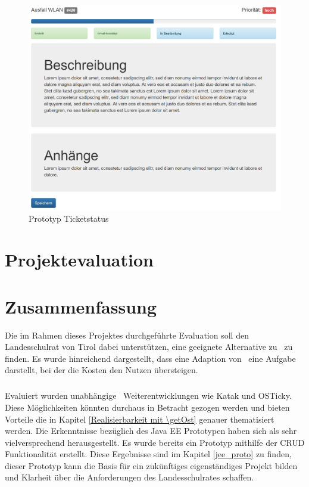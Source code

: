 \paragraph{}
\begin{figure}[h]
	\centering
	\includegraphics[scale=.5]{figures/Prototyp.png}
	\caption{Prototyp Ticketstatus}
	\label{Abb_Prototyp_Ticketstatus}
\end{figure}





\chapter{Projektevaluation}


\chapter{Zusammenfassung}
Die im Rahmen dieses Projektes durchgeführte Evaluation soll den Landesschulrat von Tirol dabei unterstützen, eine geeignete Alternative zu \getOst\ zu finden. Es wurde hinreichend dargestellt, dass eine Adaption von \getOst\ eine Aufgabe darstellt, bei der die Kosten den Nutzen übersteigen.
\paragraph{}
Evaluiert wurden unabhängige \getOst\ Weiterentwicklungen wie Katak und OSTicky. Diese Möglichkeiten könnten durchaus in Betracht gezogen werden und bieten Vorteile die in Kapitel \ref{Realisierbarkeit mit \getOst} genauer thematisiert werden. Die Erkenntnisse bezüglich des Java EE Prototypen haben sich als sehr vielversprechend herausgestellt. Es wurde bereits ein Prototyp mithilfe der CRUD Funktionalität erstellt. Diese Ergebnisse sind im Kapitel \ref{jee_proto} zu finden, dieser Prototyp kann die Basis für ein zukünftiges eigenständiges Projekt bilden und Klarheit über die Anforderungen des Landesschulrates schaffen.
